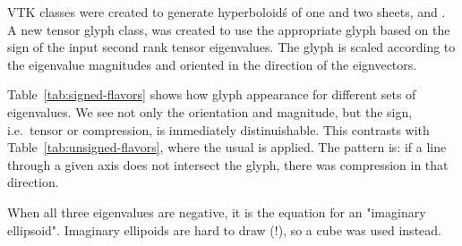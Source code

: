 \documentclass{InsightArticle}
\begin{document}
VTK classes were created to generate hyperboloid\'s of one and two sheets,
 and
.  A
new tensor glyph class,  was created
to use the appropriate glyph based on the
sign of the input second rank tensor eigenvalues. The glyph is scaled
according to the eigenvalue magnitudes and oriented in the direction of the
eignvectors.

Table~\ref{tab:signed-flavors} shows how glyph appearance for different sets
of eigenvalues.  We see not only the orientation and magnitude, but the sign,
i.e.\ tensor or compression, is immediately distinuishable. This contrasts
with Table~\ref{tab:unsigned-flavors}, where the usual 
is applied.  The pattern is: if a line through a given axis does not
intersect the glyph, there was compression in that direction.

When all three eigenvalues are negative, it is the equation for an "imaginary
ellipsoid".  Imaginary ellipoids are hard to draw (!), so a cube was used
instead.
\end{document}
